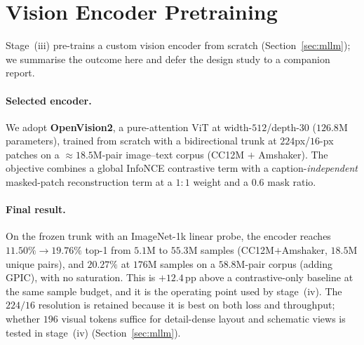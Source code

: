 ﻿\section{Vision Encoder Pretraining}\label{sec:vision}

Stage~(iii) pre-trains a custom vision encoder from scratch (Section~\ref{sec:mllm}); we summarise the outcome here and defer the design study to a companion report.

\paragraph{Selected encoder.}
We adopt \textbf{OpenVision2}, a pure-attention ViT at width-$512$/depth-$30$ ($126.8$M parameters), trained from scratch with a bidirectional trunk at $224$px/$16$-px patches on a ${\approx}18.5$M-pair image--text corpus (CC12M $+$ Amshaker).
The objective combines a global InfoNCE contrastive term with a caption-\emph{independent} masked-patch reconstruction term at a $1{:}1$ weight and a $0.6$ mask ratio.

\paragraph{Final result.}
On the frozen trunk with an ImageNet-1k linear probe, the encoder reaches $11.50\%\to\mathbf{19.76\%}$ top-1 from $5.1$M to $55.3$M samples (CC12M$+$Amshaker, $18.5$M unique pairs), and $20.27\%$ at $176$M samples on a $58.8$M-pair corpus (adding GPIC), with no saturation.
This is $+12.4$\,pp above a contrastive-only baseline at the same sample budget, and it is the operating point used by stage~(iv).
The $224/16$ resolution is retained because it is best on both loss and throughput; whether $196$ visual tokens suffice for detail-dense layout and schematic views is tested in stage~(iv) (Section~\ref{sec:mllm}).

